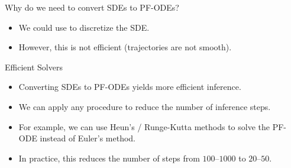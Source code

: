 \documentclass{beamer}
\begin{document}
\begin{frame}{Why do we need to convert SDEs to PF-ODEs?}
	\begin{itemize}
		\item We could use \SDESolve to discretize the SDE.
		\item However, this is not efficient (trajectories are not smooth).
	\end{itemize}
	\eqpause
	\begin{block}{Efficient Solvers}
		\begin{itemize}
			\item Converting SDEs to PF-ODEs yields more efficient inference.
			\item We can apply any \ODESolve procedure to reduce the number of inference steps.
			\item For example, we can use Heun's / Runge-Kutta methods to solve the PF-ODE instead of Euler's method.
			\item In practice, this reduces the number of steps from $100$--$1000$ to $20$--$50$.
		\end{itemize}
	\end{block}
\end{frame}
\end{document}
